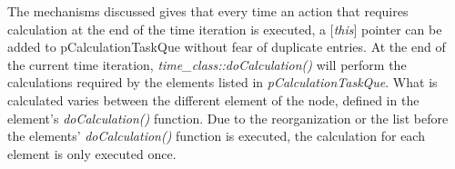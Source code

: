 The mechanisms discussed gives that every time an action that requires calculation at the end of the time iteration is executed, a [\emph{this}] pointer can be added to pCalculationTaskQue without fear of duplicate entries. 
At the end of the current time iteration, \emph{time\_class::doCalculation()} will perform the calculations required by the elements listed in \emph{pCalculationTaskQue}.    %
What is calculated varies between the different element of the node, defined in the element's \emph{doCalculation()} function.
Due to the reorganization or the list before the elements' \emph{doCalculation()} function is executed, the calculation for each element is only executed once.









\newpage



	

